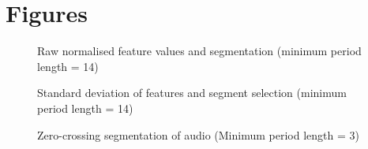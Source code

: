 \documentclass[titlepage]{scrartcl}
\begin{document}
\section{Figures}
\begin{figure}[H]
    \caption{Raw normalised feature values and segmentation (minimum period
    length = 14)}
    \label{Guitar14RawFeatures}
\end{figure}
\begin{figure}[H]
    \caption{Standard deviation of features and segment selection (minimum period
    length = 14)}
    \label{Guitar14StdDevSeg}
\end{figure}
\begin{figure}[H]
    \caption{Zero-crossing segmentation of audio (Minimum period length = 3)}
    \label{ZeroX}
\end{figure}

\printbibliography
\end{document}
